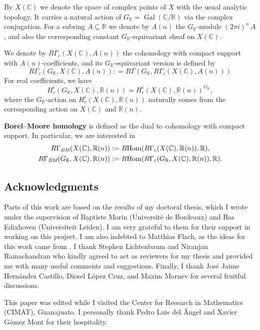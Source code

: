 \documentclass[10pt,a4paper,oneside,draft]{article}
\DeclareMathOperator{\Gal}{Gal}
\DeclareMathOperator{\Hom}{Hom}
\newcommand{\CC}{\mathbb{C}}
\newcommand{\RR}{\mathbb{R}}
\newcommand{\BM}{\text{\it BM}}
\newcommand{\dfn}{\mathrel{\mathop:}=}
\newcommand{\RHom}{R\!\Hom}
\theoremstyle{myplain}
\theoremstyle{mydefinition}
\numberwithin{equation}{section}
\begin{document}
By $X (\CC)$ we denote the space of complex points of $X$ with the usual
analytic topology. It carries a natural action of $G_\RR = \Gal (\CC/\RR)$ via
the complex conjugation. For a subring $A \subseteq \RR$ we denote by $A (n)$
the $G_\RR$-module $(2\pi i)^n\,A$, and also the corresponding constant
$G_\RR$-equivariant sheaf on $X (\CC)$.

We denote by $R\Gamma_c (X (\CC), A (n))$ the cohomology with compact support
with $A (n)$-coefficients, and its $G_\RR$-equivariant version is defined by
$$R\Gamma_c (G_\RR, X (\CC), A (n)) \dfn R\Gamma (G_\RR, R\Gamma_c (X (\CC), A (n)))$$
For real coefficients, we have
$$H_c^i (G_\RR, X (\CC), \RR (n)) = H^i_c (X (\CC), \RR (n))^{G_\RR},$$
where the $G_\RR$-action on $H^i_c (X (\CC), \RR (n))$ naturally comes from the
corresponding action on $X (\CC)$ and $\RR (n)$.

\textbf{Borel--Moore homology} is defined as the dual to cohomology with compact
support. In particular, we are interested in
\begin{align*}
  R\Gamma_\BM (X (\CC), \RR (n)) & \dfn
  \RHom (R\Gamma_c (X (\CC), \RR (n)), \RR), \\
  R\Gamma_\BM (G_\RR, X (\CC), \RR (n)) & \dfn
  \RHom (R\Gamma_c (G_\RR, X (\CC), \RR (n)), \RR).
\end{align*}

\subsection*{Acknowledgments}

Parts of this work are based on the results of my doctoral thesis, which I wrote
under the supervision of Baptiste Morin (Université de Bordeaux) and Bas
Edixhoven (Universiteit Leiden). I am very grateful to them for their support in
working on this project. I am also indebted to Matthias Flach, as the ideas for
this work came from \cite{Flach-Morin-2018}. I thank Stephen Lichtenbaum and
Niranjan Ramachandran who kindly agreed to act as reviewers for my thesis and
provided me with many useful comments and suggestions. Finally, I thank Jos\'{e}
Jaime Hern\'{a}ndez Castillo, Diosel L\'{o}pez Cruz, and Maxim Mornev for
several fruitful discussions.

This paper was edited while I visited the Center for Research in Mathematics
(CIMAT), Guanajuato. I personally thank Pedro Luis del \'{A}ngel and
Xavier G\'{o}mez Mont for their hospitality.

\end{document}
